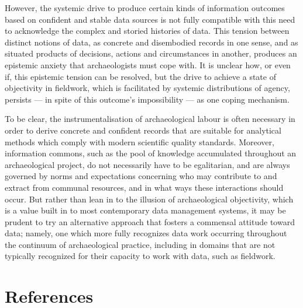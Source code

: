 \documentclass[
]{article}
\begin{document}
However, the systemic drive to produce certain kinds of information
outcomes based on confident and stable data sources is not fully
compatible with this need to acknowledge the complex and storied
histories of data. This tension between distinct notions of data, as
concrete and disembodied records in one sense, and as situated products
of decisions, actions and circumstances in another, produces an
epistemic anxiety that archaeologists must cope with. It is unclear how,
or even if, this epistemic tension can be resolved, but the drive to
achieve a state of objectivity in fieldwork, which is facilitated by
systemic distributions of agency, persists --- in spite of this
outcome's impossibility --- as one coping mechanism.

To be clear, the instrumentalisation of archaeological labour is often
necessary in order to derive concrete and confident records that are
suitable for analytical methods which comply with modern scientific
quality standards. Moreover, information commons, such as the pool of
knowledge accumulated throughout an archaeological project, do not
necessarily have to be egalitarian, and are always governed by norms and
expectations concerning who may contribute to and extract from communal
resources, and in what ways these interactions should occur. But rather
than lean in to the illusion of archaeological objectivity, which is a
value built in to most contemporary data management systems, it may be
prudent to try an alternative approach that fosters a commensal attitude
toward data; namely, one which more fully recognizes data work occurring
throughout the continuum of archaeological practice, including in
domains that are not typically recognized for their capacity to work
with data, such as fieldwork.

\section{References}\label{references}
\end{document}
